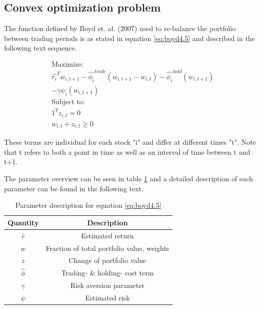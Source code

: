 \documentclass[final]{LTHtwocol} %
\begin{document}
\subsection{Convex optimization problem}
The function defined by Boyd et. al. (2007) used to re-balance the portfolio between trading periods is as stated in equation \ref{eq:boyd4.5} and described in the following text sequence. \cite{Boyd}

\begin{equation}
\label{eq:boyd4.5}
\begin{split}
&\text{Maximize:}\\
&\hat{r_i }^T w_{i,t+1} - \hat{\phi_i}^{trade}(w_{i,t+1}-w_{i,t})-\hat{\phi_i}^{hold}(w_{i,t+1})\\
&-\gamma \psi_i(w_{i,t+1}) \\
&\text{Subject to:} \\
&1^{T}z_{i,t} = 0\\
&w_{i,t}+z_{i,t} \geq 0
\end{split}
\end{equation}


These terms are individual for each stock "i" and differ at different times "t". Note that t refers to both a point in time as well as an interval of time between t and t+1.

The parameter overview can be seen in table \ref{table:1} and a detailed description of each parameter can be found in the following text.

\begin{table}[h!]
\begin{center}
\label{paramDescr}
 \begin{tabular}{||c c||} 
 \hline
 Quantity & Description \\ [0.5ex] 
 \hline\hline
 $\hat{r}$ & Estimated return \\ 
 \hline
 $w$ & Fraction of total portfolio value, weights \\
 \hline
 $z$ & Change of portfolio value \\
 \hline
 $\hat{\phi}$ & Trading- \& holding- cost term\\
 \hline
 $\gamma$ & Risk aversion parameter  \\
 \hline
 $\psi$ & Estimated risk  \\ [1ex] 
 \hline
\end{tabular}
\caption{Parameter description for equation \ref{eq:boyd4.5}}
\label{table:1}
\end{center}
\end{table}
\end{document}
